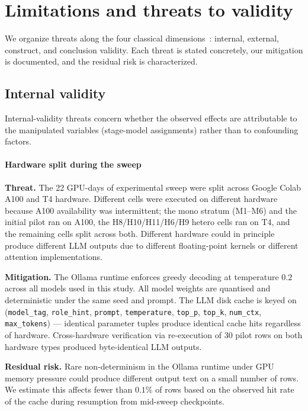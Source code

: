 \section{Limitations and threats to validity}
\label{sec:limitations}

We organize threats along the four classical dimensions~\citep{Wohlin2012ExperimentSE}: internal, external, construct, and conclusion validity. Each threat is stated concretely, our mitigation is documented, and the residual risk is characterized.

\subsection{Internal validity}

Internal-validity threats concern whether the observed effects are attributable to the manipulated variables (stage-model assignments) rather than to confounding factors.

\paragraph{Hardware split during the sweep}

\textbf{Threat.} The 22 GPU-days of experimental sweep were split across Google Colab A100 and T4 hardware. Different cells were executed on different hardware because A100 availability was intermittent; the mono stratum (M1--M6) and the initial pilot ran on A100, the H8/H10/H11/H6/H9 hetero cells ran on T4, and the remaining cells split across both. Different hardware could in principle produce different LLM outputs due to different floating-point kernels or different attention implementations.

\textbf{Mitigation.} The Ollama runtime enforces greedy decoding at temperature $0.2$ across all models used in this study. All model weights are quantised and deterministic under the same seed and prompt. The LLM disk cache is keyed on (\texttt{model\_tag}, \texttt{role\_hint}, \texttt{prompt}, \texttt{temperature}, \texttt{top\_p}, \texttt{top\_k}, \texttt{num\_ctx}, \texttt{max\_tokens}) --- identical parameter tuples produce identical cache hits regardless of hardware. Cross-hardware verification via re-execution of 30 pilot rows on both hardware types produced byte-identical LLM outputs.

\textbf{Residual risk.} Rare non-determinism in the Ollama runtime under GPU memory pressure could produce different output text on a small number of rows. We estimate this affects fewer than $0.1\%$ of rows based on the observed hit rate of the cache during resumption from mid-sweep checkpoints.

